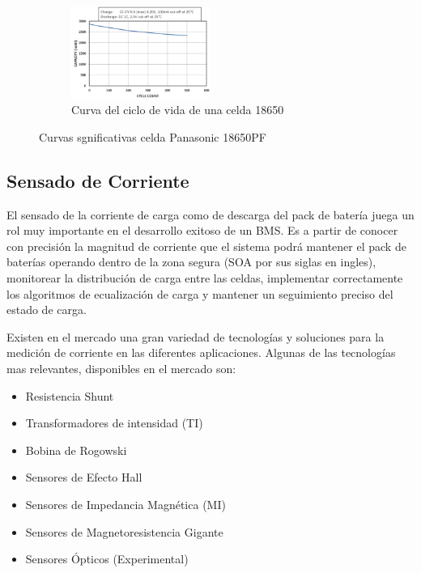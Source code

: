 \documentclass[10pt,a4paper]{article}
\begin{document}
\begin{figure}[h!]
\begin{subfigure}[t]{.5\textwidth}
    			\label{descarga_18650}
    	\end{subfigure}
        ~ 
    	\begin{centering}
        	 \begin{subfigure}[t]{1\textwidth}
        	 	\centering
        	 		\includegraphics[width=0.5\textwidth]{life_cycle_18650.png}
        	 		\caption{Curva del ciclo de vida de una celda 18650}
        	 		\label{life_cycle_18650}
        	 \end{subfigure}
         \end{centering}
        \caption{Curvas sgnificativas celda Panasonic 18650PF}
        \label{curvas_sign_18650}
	\end{figure}

    \newpage 

	\subsection{Sensado de Corriente}
	
    El sensado de la corriente de carga como de descarga del 
    pack de batería juega un rol muy importante en el desarrollo exitoso de un 
    \acrshort{BMS}. Es a partir de conocer con precisión la magnitud de corriente que el 
    sistema podrá mantener el pack de baterías operando dentro de la zona 
    segura (\acrshort{SOA} por sus siglas en ingles), monitorear la distribución de carga 
    entre las celdas, implementar correctamente los algoritmos de ecualización 
    de carga y mantener un seguimiento preciso del estado de carga.
	
	\noindent Existen en el mercado una gran variedad de tecnologías y 
    soluciones para la medición de corriente en las diferentes aplicaciones. 
    Algunas de las tecnologías mas relevantes, disponibles en el mercado son:
	\begin{itemize}
		\item Resistencia Shunt
		\item Transformadores de intensidad (TI)
		\item Bobina de Rogowski 
		\item Sensores de Efecto Hall
		\item Sensores de Impedancia Magnética (MI)
		\item Sensores de Magnetoresistencia Gigante 
		\item Sensores Ópticos (Experimental)
	\end{itemize}
	
\end{document}
